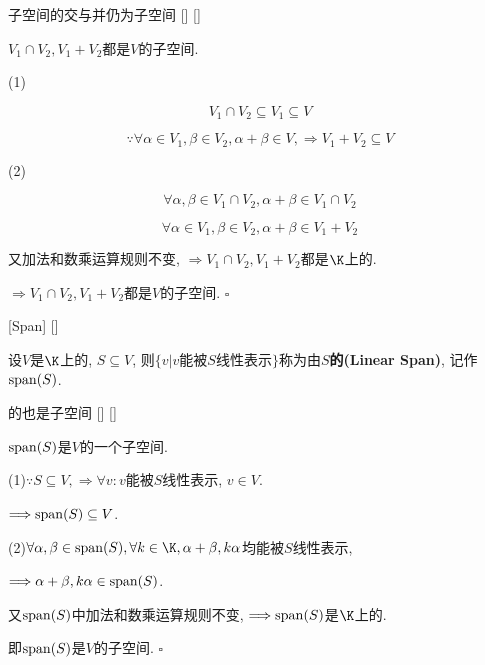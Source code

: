 \documentclass[UTF8]{ctexart}
\begin{document}
		\begin{ppt}
			[]
			{子空间的交与并仍为子空间}
			[]
			[]

			$V_{1}\cap V_{2}, V_{1}+V_{2}$都是$V$的子空间. 
		\end{ppt}
  
		\begin{prf}
		
			(1)
			
			\[V_{1}\cap V_{2}\subseteq V_{1}\subseteq V\]
			
			\[\because \forall \alpha \in V_{1},\beta\in V_{2}, \alpha+\beta\in V, \Longrightarrow V_{1}+V_{2}\subseteq V\]
			
			(2)
			
			\[\forall \alpha,\beta \in V_{1}\cap V_{2}, \alpha+\beta\in V_{1}\cap V_{2}\]
			
			\[\forall \alpha \in V_{1}, \beta\in V_{2}, \alpha+\beta\in V_{1}+V_{2}\]
			
			又加法和数乘运算规则不变, $\Longrightarrow V_{1}\cap V_{2}, V_{1}+V_{2}$都是$\K$上的. 
			
			$\Longrightarrow V_{1}\cap V_{2}, V_{1}+V_{2}$都是$V$的子空间. $\square$
		\end{prf}
  
		\begin{dfn}
			[Span]
			{\张成}
			[Span]
			[]

			设$V$是$\K$上的, $S \subseteq V$, 则$\{v|v$能被$S$线性表示$\}$称为由$S$\textbf{ 的(Linear Span)}, 记作${\rm span}(S)$. 
		\end{dfn}
		
		\begin{ppt}
			[]
			{ 的\线性空间 也是子空间}
			[]
			[]

			${\rm span}(S)$是$V$的一个子空间. 
		\end{ppt}
  
	    \begin{prf}		
			
			(1)$\because S\subseteq V, \Longrightarrow\forall v: v$能被$S$线性表示, $v\in V$. 
			
			$\Longrightarrow {\rm span}(S)\subseteq V$. 
			
			(2)$\forall \alpha, \beta\in {\rm span}(S), \forall k\in\K, \alpha+\beta,k\alpha$均能被$S$线性表示, 
			
			$\Longrightarrow \alpha+\beta, k\alpha\in {\rm span}(S)$. 
			
			又${\rm span}(S)$中加法和数乘运算规则不变, $\Longrightarrow {\rm span}(S)$是$\K$上的\线性空间. 
			
			即${\rm span}(S)$是$V$的子空间. $\square$
        \end{prf}
		
\end{document}
